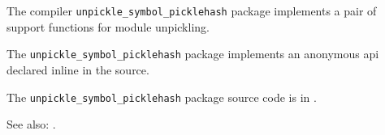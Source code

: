 
The compiler {\tt unpickle\_symbol\_picklehash} package implements a pair of support 
functions for module unpickling.

The {\tt unpickle\_symbol\_picklehash} package implements an anonymous api declared inline in the source.

The {\tt unpickle\_symbol\_picklehash} package source code is in .

See also:  .
